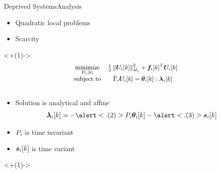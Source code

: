 \documentclass[aspectratio=169]{beamer}
\begin{document}
\begin{frame}{Deprived Systems}{Analysis}
  \begin{minipage}[t]{.45\textwidth}
    \begin{assumptions}
      \begin{itemize}[<+(1)->]
        \item Quadratic local problems
        \item Scarcity
      \end{itemize}
    \end{assumptions}
  \end{minipage}
  \hfill
  \begin{minipage}[t]{0.45\textwidth}
    \centering
    \onslide<+(1)->{
      \begin{equation*}
        \small
        \begin{matrix}
          {\minimize\limits_{\vec{U}_{i}[k]}}&{\frac{1}{2}\norm{\vec{U}_{i}[k]}^{2}_{H_{i}} + {\vec{f}_{i}[k]}^{T}\vec{U}_{i}[k]}\\
          \mathrm{subject~ to} & \bar{\Gamma}_{i}\vec{U}_{i}[k] = \thetaik:\lambdaik \\
                                             &\\
        \end{matrix}
      \end{equation*}
    }
  \end{minipage}

  \begin{itemize}[<+(1)->]
    \item Solution is analytical and affine
          \begin{equation*}
            \lambdaik=-\alert<.(2)>{\Plin}\thetaik-\alert<.(3)>{\sik}
          \end{equation*}
  \end{itemize}

  \vspace{-.5cm}
  \hfill
  \begin{minipage}[t]{.45\linewidth}
    \begin{itemize}[<+(1)->]
      \item ${P}_{i}$ is time invariant 
      \item $\boldsymbol{s}_{i}[k]$ is time variant
    \end{itemize}
  \end{minipage}
  \onslide<+(1)->{
  }
\end{frame}
\end{document}
